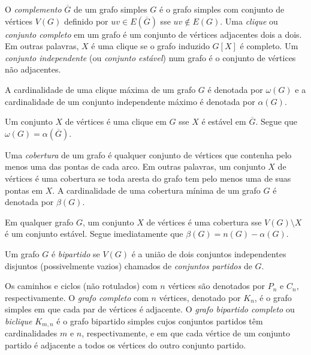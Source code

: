 \documentclass{article}
\begin{document}
\begin{defn}
    O \emph{complemento} \(\overline{G}\) de um grafo simples \(G\) é o grafo simples com conjunto de vértices \(V(G)\) definido por \(uv \in E(\overline{G})\) sse \(uv \notin E(G)\).
    Uma \emph{clique} ou \emph{conjunto completo} em um grafo é um conjunto de vértices adjacentes dois a dois. Em outras palavras, \(X\) é uma clique se o grafo induzido \(G[X]\) é completo.
    Um \emph{conjunto independente} (ou \emph{conjunto estável}) num grafo é o conjunto de vértices não adjacentes.

    A cardinalidade de uma clique máxima de um grafo \(G\) é denotada por \(\omega(G)\) e a cardinalidade de um conjunto independente máximo é denotada por \(\alpha(G)\).
\end{defn}

\begin{rem}
    Um conjunto \(X\) de vértices é uma clique em \(G\) sse \(X\) é estável em \(\overline{G}\). Segue que \(\omega(G) = \alpha(\overline{G})\).
\end{rem}

\begin{defn}
    Uma \emph{cobertura} de um grafo é qualquer conjunto de vértices que contenha pelo menos uma das pontas de cada arco. Em outras palavras, um conjunto \(X\) de vértices é uma cobertura se toda aresta do grafo tem pelo menos uma de suas pontas em \(X\). A cardinalidade de uma cobertura mínima de um grafo \(G\) é denotada por \(\beta(G)\).
\end{defn}

\begin{rem}
    Em qualquer grafo \(G\), um conjunto \(X\) de vértices é uma cobertura sse \(V(G) \setminus X\) é um conjunto estável. Segue imediatamente que \(\beta(G) = n(G) - \alpha(G)\).
\end{rem}

\begin{defn}
    Um grafo \(G\) é \emph{bipartido} se \(V(G)\) é a união de dois conjuntos independentes disjuntos (possivelmente vazios) chamados de \emph{conjuntos partidos} de \(G\).
\end{defn}

\begin{defn}
    Os caminhos e ciclos (não rotulados) com \(n\) vértices são denotados por \(P_n\) e \(C_n\), respectivamente. O \emph{grafo completo} com \(n\) vértices, denotado por \(K_n\), é o grafo simples em que cada par de vértices é adjacente. O \emph{grafo bipartido completo} ou \emph{biclique} \(K_{m,n}\) é o grafo bipartido simples cujos conjuntos partidos têm cardinalidades \(m\) e \(n\), respectivamente, e em que cada vértice de um conjunto partido é adjacente a todos os vértices do outro conjunto partido.
\end{defn}
\end{document}
